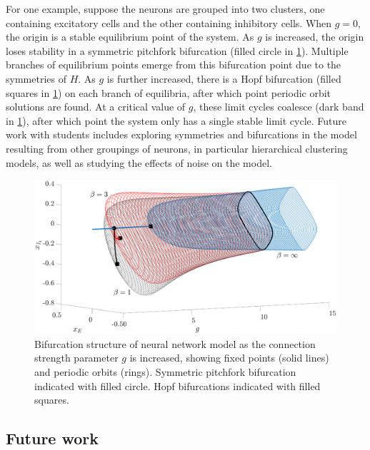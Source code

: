 \documentclass[11pt,reqno,oneside]{article}
\theoremstyle{definition}
\theoremstyle{remark}
\begin{document}
For one example, suppose the neurons are grouped into two clusters, one containing excitatory cells and the other containing inhibitory cells. When $g = 0$, the origin is a stable equilibrium point of the system. As $g$ is increased, the origin loses stability in a symmetric pitchfork bifurcation (filled circle in \cref{fig:neuroBD}). Multiple branches of equilibrium points emerge from this bifurcation point due to the symmetries of $H$. As $g$ is further increased, there is a Hopf bifurcation (filled squares in \cref{fig:neuroBD}) on each branch of equilibria, after which point periodic orbit solutions are found. At a critical value of $g$, these limit cycles coalesce (dark band in \cref{fig:neuroBD}), after which point the system only has a single stable limit cycle. Future work with students includes exploring symmetries and bifurcations in the model resulting from other groupings of neurons, in particular hierarchical clustering models, as well as studying the effects of noise on the model. 

\begin{figure}
    \centering
    \includegraphics[width=12cm]{images/pitchbif.eps}
    \caption{Bifurcation structure of neural network model as the connection strength parameter $g$ is increased, showing fixed points (solid lines) and periodic orbits (rings). Symmetric pitchfork bifurcation indicated with filled circle. Hopf bifurcations indicated with filled squares.}
    \label{fig:neuroBD}
\end{figure}

\subsection*{Future work}



\footnotesize{  }
\end{document}
